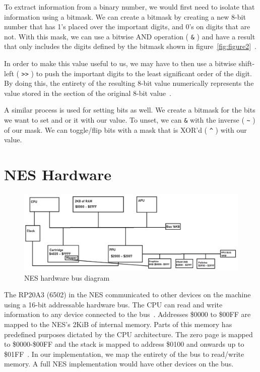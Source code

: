 \documentclass[12pt]{article}
\begin{document}
To extract information from a binary number, we would first need to isolate that information using a bitmask.
We can create a bitmask by creating a new 8-bit number that has
1's placed over the important digits, and 0's on digits that are not. With this mask, we can use a
bitwise AND operation ( \lstinline{&} ) and have a result that only includes the digits defined by the bitmask shown in figure~\ref{fig:figure2}~\cite{bitmasks}.

In order to make this value useful to us, we may have to then use a bitwise shift-left ( \lstinline{>>} ) to push
the important digits to the least significant order of the digit. By doing this, the entirety of the
resulting 8-bit value numerically represents the value stored in the section of the original 8-bit
value~\cite{bitmasks}.

A similar process is used for setting bits as well. We create a bitmask for the bits we want to set
and or it with our value. To unset, we can \lstinline{&} with the inverse ( \lstinline{~} ) of our mask.
We can toggle/flip bits with a mask that is XOR'd ( \lstinline{^} ) with our value.

\section{NES Hardware}
\label{sec:neshardware}

\begin{figure}[h]
	\includegraphics[width=2.0\linewidth,bb=0 0 1049 379]{NES_diagram.PNG}
	\caption{NES hardware bus diagram}
	\label{fig:nes_diag}
\end{figure}

The RP20A3 (6502) in the NES communicated to other devices on the machine using a 16-bit addressable
hardware bus. The CPU can read and write information to any device connected to the bus~\cite{mem_mapping}. 
Addresses \$0000 to \$00FF are mapped to the NES's 2KiB of internal memory. Parts of this memory has
predefined purposes dictated by the CPU architecture. The zero page is mapped to \$0000-\$00FF and the stack
is mapped to address \$0100 and onwards up to \$01FF~\cite{mem_mapping}. In our implementation, we map the entirety of the
bus to read/write memory. A full NES implementation would have other devices on the bus.
\end{document}
